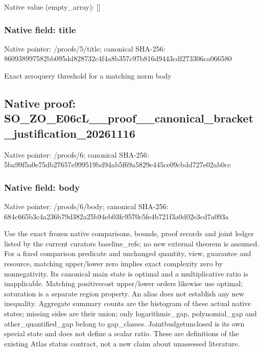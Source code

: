 \documentclass[10pt,a4paper]{article}
\begin{document}
Native value (empty\_array): []



\subsubsection{Native field: title}


Native pointer: /proofs/5/title; canonical SHA-256: 860938997582bb095dd82873\allowbreak{}2c4f4a8b357c97b816d9443c\allowbreak{}df273306ca066580


Exact zeroquery threshold for a matching norm body


\subsection{Native proof: SO\_ZO\_E06cL\_\_proof\_\_cano\allowbreak{}nical\_bracket\_justificat\allowbreak{}ion\_20261116}


Native pointer: /proofs/6; canonical SHA-256: 5ba99f5a0e75db27657e9995\allowbreak{}19bd94ab5f69a5829e445ce0\allowbreak{}9cbdd727e02ab0cc



\subsubsection{Native field: body}


Native pointer: /proofs/6/body; canonical SHA-256: 684c665b3c4a236b79d382a2\allowbreak{}5b94eb03fc9570c5fe4b721f\allowbreak{}3a0d02e3cd7a093a


Use the exact frozen native comparisons, bounds, proof records and joint ledger listed by the current curators baseline\_refs; no new external theorem is assumed. For a fixed comparison predicate and unchanged quantity, view, guarantee and resource, matching upper/lower zero implies exact complexity zero by nonnegativity. Its canonical main state is optimal and a multiplicative ratio is inapplicable. Matching positivecost upper/lower orders likewise use optimal; saturation is a separate region property. An alias does not establish any new inequality. Aggregate summary counts are the histogram of these actual native states; missing sides are their union; only logarithmic\_gap, polynomial\_gap and other\_quantified\_gap belong to gap\_classes. Jointbudgetunclosed is its own special state and does not define a scalar ratio. These are definitions of the existing Atlas status contract, not a new claim about unassessed literature.
\end{document}
